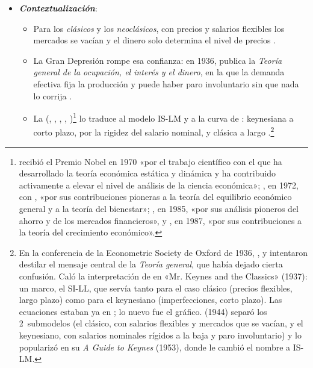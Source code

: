 \documentclass[11pt]{article}
\begin{document}
\begin{itemize}
\item \textbf{\emph{Contextualización}}:
  \begin{itemize}
  \item Para los \emph{clásicos} y los \emph{neoclásicos}, con precios y salarios flexibles los mercados se vacían y el dinero solo determina el nivel de precios  .
  \item La Gran Depresión rompe esa confianza: en 1936,  publica la \emph{Teoría general de la ocupación, el interés y el dinero}, en la que la demanda efectiva fija la producción y puede haber paro involuntario sin que nada lo corrija\nocite{Keynes1936} .
  \item La  (, , , , )\footnote{ recibió el Premio Nobel en 1970 «por el trabajo científico con el que ha desarrollado la teoría económica estática y dinámica y ha contribuido activamente a elevar el nivel de análisis de la ciencia económica»\nocite{Nobel1970Samuelson}; , en 1972, con , «por sus contribuciones pioneras a la teoría del equilibrio económico general y a la teoría del bienestar»\nocite{Nobel1972HicksArrow}; , en 1985, «por sus análisis pioneros del ahorro y de los mercados financieros»\nocite{Nobel1985Modigliani}, y , en 1987, «por sus contribuciones a la teoría del crecimiento económico»\nocite{Nobel1987Solow}.} lo traduce al modelo IS-LM y a la curva de : keynesiana a corto plazo, por la rigidez del salario nominal, y clásica a largo .\footnote{En la conferencia de la Econometric Society de Oxford de 1936, ,  y  intentaron destilar el mensaje central de la \emph{Teoría general}, que había dejado cierta confusión. Caló la interpretación de  en «Mr. Keynes and the Classics» (1937): un marco, el SI-LL, que servía tanto para el caso clásico (precios flexibles, largo plazo) como para el keynesiano (imperfecciones, corto plazo). Las ecuaciones estaban ya en ; lo nuevo fue el gráfico.  (1944) separó los 2~submodelos (el clásico, con salarios flexibles y mercados que se vacían, y el keynesiano, con salarios nominales rígidos a la baja y paro involuntario) y  lo popularizó en su \emph{A Guide to Keynes} (1953), donde le cambió el nombre a IS-LM.}

\end{itemize}
\end{itemize}
\end{document}
